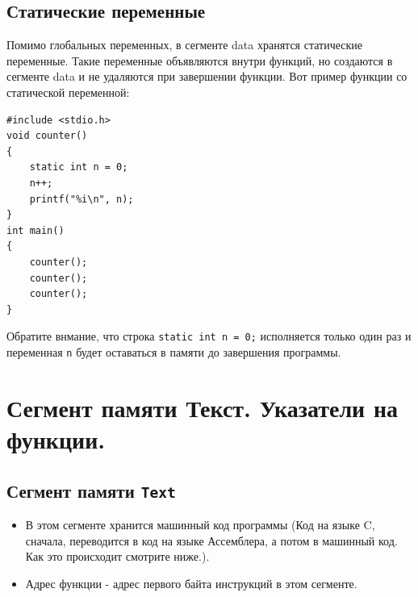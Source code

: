 \documentclass[10pt]{article}
\begin{document}
\subsection*{Статические переменные}
Помимо глобальных переменных, в сегменте data хранятся статические переменные. Такие переменные объявляются внутри функций, но создаются в сегменте data и не удаляются при завершении функции. Вот пример функции со статической переменной:
\begin{lstlisting}
#include <stdio.h>
void counter() 
{
    static int n = 0;
    n++;
    printf("%i\n", n);
}
int main() 
{
    counter();
    counter();
    counter();
}
\end{lstlisting}
Обратите внмание, что строка \texttt{static int n = 0;} исполняется только один раз и переменная \texttt{n} будет оставаться в памяти до завершения программы.



\newpage
\section*{Сегмент памяти Текст. Указатели на функции.}

\subsection*{Сегмент памяти \texttt{Text}}
\begin{itemize}
\item В этом сегменте хранится машинный код программы (Код на языке C, сначала, переводится в код на языке Ассемблера, а потом в машинный код. Как это происходит смотрите ниже.).
\item Адрес функции - адрес первого байта инструкций в этом сегменте.
\end{itemize}
\end{document}
